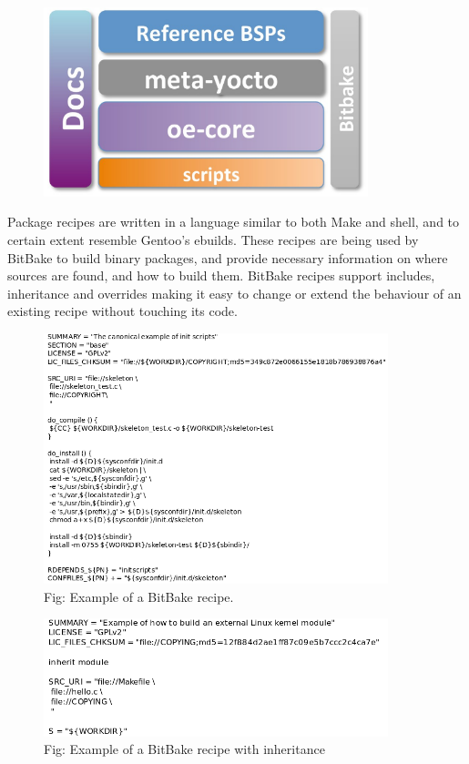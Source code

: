 \documentclass[10pt, a5paper]{article}
\begin{document}
\begin{figure}[h!]
  \centering
  \includegraphics[height=5.5cm]{w_07_2016_Shadura2.png}
\end{figure}

Package recipes are written in a language similar to both Make and shell, and to certain extent resemble Gentoo's ebuilds. These recipes are being used by BitBake to build binary packages, and provide necessary information on where sources are found, and how to build them. BitBake recipes support includes, inheritance and overrides making it easy to change or extend the behaviour of an existing recipe without touching its code.

\begin{figure}[H]
  \centering
  \includegraphics[width=10cm]{w_07_2016_Shadura3.png}
  \caption* {Fig: Example of a BitBake recipe.}
\end{figure}

\begin{figure}[H]
  \centering
  \includegraphics[width=10cm]{w_07_2016_Shadura4.png}
  \caption* {Fig: Example of a BitBake recipe with inheritance}
\end{figure}
\end{document}
